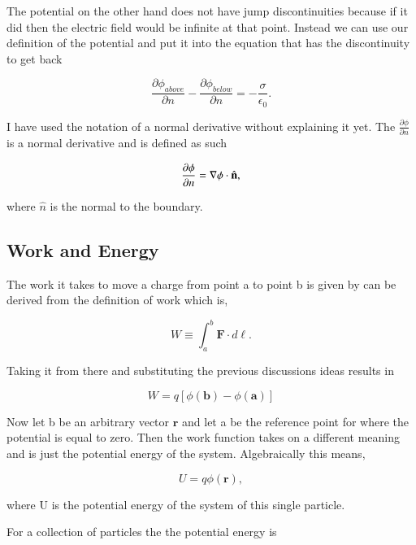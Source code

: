 \documentclass[preprint, review,12pt]{elsarticle}
\def\.{\cdot}
\def\b{\textbf}
\def\bell{\bm{\ell}}
\def\={\equiv}
\begin{document}
The potential on the other hand does not have jump discontinuities because if it did then the electric field would be infinite at that point. Instead we can use our definition of the potential and put it into the equation that has the discontinuity to get back

\begin{equation}
    \frac{\partial \phi_{above}}{\partial n} - \frac{\partial \phi_{below}}{\partial n} = -\frac{\sigma}{\epsilon_0}.
\end{equation}

I have used the notation of a normal derivative without explaining it yet. The $\frac{\partial \phi}{\partial n}$ is a normal derivative and is defined as such

\begin{equation}
    \frac{\partial \phi}{\partial n} = \nabla \phi \. \hat{\b n},
\end{equation}

where $\hat{n}$ is the normal to the boundary. 


\subsection{Work and Energy}

The work it takes to move a charge from point a to point b is given by can be derived from the definition of work which is,

\begin{equation}
    W \= \int_a^b \b{F}\. d\bell.
\end{equation}

Taking it from there and substituting the previous discussions ideas results in

\begin{equation}
    W = q[\phi(\b{b})-\phi(\b{a})]
\end{equation}

Now let b be an arbitrary vector $\b{r}$ and let a be the reference point for where the potential is equal to zero. Then the work function takes on a different meaning and is just the potential energy of the system. Algebraically this means,

\begin{equation}
    U = q\phi(\b{r}),
\end{equation}

where U is the potential energy of the system of this single particle.

For a collection of particles the the potential energy is
\end{document}
